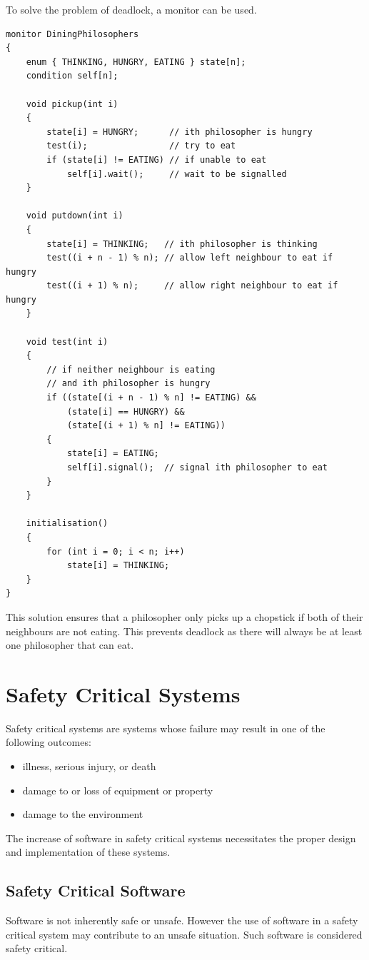 \documentclass{article}
\begin{document}
To solve the problem of deadlock, a monitor can be used.
\begin{verbatim}
monitor DiningPhilosophers
{
    enum { THINKING, HUNGRY, EATING } state[n];
    condition self[n];

    void pickup(int i)
    {
        state[i] = HUNGRY;      // ith philosopher is hungry
        test(i);                // try to eat
        if (state[i] != EATING) // if unable to eat
            self[i].wait();     // wait to be signalled
    }

    void putdown(int i)
    {
        state[i] = THINKING;   // ith philosopher is thinking
        test((i + n - 1) % n); // allow left neighbour to eat if hungry
        test((i + 1) % n);     // allow right neighbour to eat if hungry
    }

    void test(int i)
    {
        // if neither neighbour is eating
        // and ith philosopher is hungry
        if ((state[(i + n - 1) % n] != EATING) &&
            (state[i] == HUNGRY) &&
            (state[(i + 1) % n] != EATING))
        {
            state[i] = EATING;
            self[i].signal();  // signal ith philosopher to eat
        }
    }

    initialisation()
    {
        for (int i = 0; i < n; i++)
            state[i] = THINKING;
    }
}
\end{verbatim}
This solution ensures that a philosopher only picks up a chopstick if
both of their neighbours are not eating. This prevents deadlock as
there will always be at least one philosopher that can eat.
\section{Safety Critical Systems}
Safety critical systems are systems whose failure may result in one of
the following outcomes:
\begin{itemize}
    \item illness, serious injury, or death
    \item damage to or loss of equipment or property
    \item damage to the environment
\end{itemize}
The increase of software in safety critical systems necessitates the
proper design and implementation of these systems.
\subsection{Safety Critical Software}
Software is not inherently safe or unsafe. However the use of software
in a safety critical system may contribute to an unsafe situation. Such
software is considered safety critical.
\end{document}
